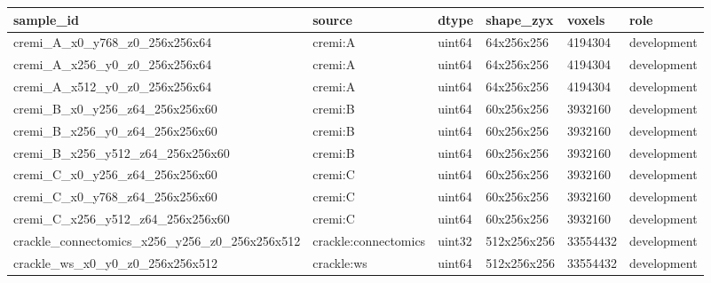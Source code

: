 \begin{tabular}{llllll}
\hline
sample\_id & source & dtype & shape\_zyx & voxels & role \\
\hline
cremi\_A\_x0\_y768\_z0\_256x256x64 & cremi:A & uint64 & 64x256x256 & 4194304 & development \\
cremi\_A\_x256\_y0\_z0\_256x256x64 & cremi:A & uint64 & 64x256x256 & 4194304 & development \\
cremi\_A\_x512\_y0\_z0\_256x256x64 & cremi:A & uint64 & 64x256x256 & 4194304 & development \\
cremi\_B\_x0\_y256\_z64\_256x256x60 & cremi:B & uint64 & 60x256x256 & 3932160 & development \\
cremi\_B\_x256\_y0\_z64\_256x256x60 & cremi:B & uint64 & 60x256x256 & 3932160 & development \\
cremi\_B\_x256\_y512\_z64\_256x256x60 & cremi:B & uint64 & 60x256x256 & 3932160 & development \\
cremi\_C\_x0\_y256\_z64\_256x256x60 & cremi:C & uint64 & 60x256x256 & 3932160 & development \\
cremi\_C\_x0\_y768\_z64\_256x256x60 & cremi:C & uint64 & 60x256x256 & 3932160 & development \\
cremi\_C\_x256\_y512\_z64\_256x256x60 & cremi:C & uint64 & 60x256x256 & 3932160 & development \\
crackle\_connectomics\_x256\_y256\_z0\_256x256x512 & crackle:connectomics & uint32 & 512x256x256 & 33554432 & development \\
crackle\_ws\_x0\_y0\_z0\_256x256x512 & crackle:ws & uint64 & 512x256x256 & 33554432 & development \\
\hline
\end{tabular}
